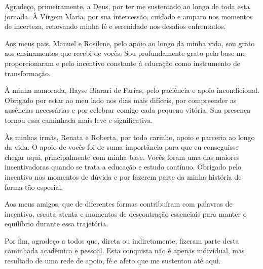 \begin{agradecimentos}

Agradeço, primeiramente, a Deus, por ter me sustentado ao longo de toda esta jornada. À Virgem Maria, por sua intercessão, cuidado e amparo nos momentos de incerteza, renovando minha fé e serenidade nos desafios enfrentados.

Aos meus pais, Manuel e Rosilene,  pelo apoio ao longo da minha vida, sou grato aos ensinamentos que recebi de vocês. Sou profundamente grato pela base me proporcionaram e pelo incentivo constante à educação como instrumento de transformação.

À minha namorada, Hayse Biarari de Farias, pelo paciência e apoio incondicional. Obrigado por estar ao meu lado nos dias mais difíceis, por compreender as ausências necessárias e por celebrar comigo cada pequena vitória. Sua presença tornou essa caminhada mais leve e significativa.

Às minhas irmãs, Renata e Roberta, por todo carinho, apoio e parceria ao longo da vida. O apoio de vocês foi de suma importância para que eu conseguisse chegar aqui, principalmente com minha base. Vocês foram uma das maiores incentivadoras quando se trata a educação e estudo contínuo. Obrigado pelo incentivo nos momentos de dúvida e por fazerem parte da minha história de forma tão especial.

Aos meus amigos, que de diferentes formas contribuíram com palavras de incentivo, escuta atenta e momentos de descontração essenciais para manter o equilíbrio durante essa trajetória.

Por fim, agradeço a todos que, direta ou indiretamente, fizeram parte desta caminhada acadêmica e pessoal. Esta conquista não é apenas individual, mas resultado de uma rede de apoio, fé e afeto que me sustentou até aqui.

\end{agradecimentos}
